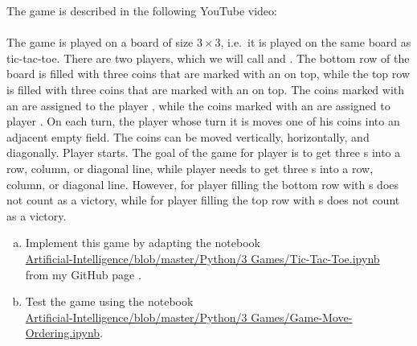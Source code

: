\exercise
The game  is described in the following YouTube video:
\\[0.2cm]
\hspace*{1.3cm}
\href{https://www.youtube.com/watch?v=R-aSW1MQwEo}{}
\\[0.2cm]
The game is played on a board of size $3 \times 3$, i.e.~it is played on the same board as tic-tac-toe.
There are two players, which we will call  and .  The bottom row of the board is filled
with three coins that are marked with an  on top, while the top row is filled with three coins that
are marked with an  on top.  The coins marked with an  are assigned to the player ,
while the coins marked with an  are assigned to player .
On each turn, the player whose turn it is moves one of his coins into an adjacent empty field.  The coins can be
moved vertically, horizontally, and diagonally. 
Player  starts.  The goal of the game for player  is to get three s into a row, column, or
diagonal line, while player  needs to get three s into a row, column, or diagonal line.  However, for
player  filling the bottom row with s does not count as a victory, while for player
  filling the top row with s does not count as a victory.
\begin{enumerate}[(a)]
\item Implement this game by adapting the notebook
      \\[0.2cm]
      \hspace*{1.3cm}
      \href{https://github.com/karlstroetmann/Artificial-Intelligence/blob/master/Python/3 Games/Tic-Tac-Toe.ipynb}{
            Artificial-Intelligence/blob/master/Python/3 Games/Tic-Tac-Toe.ipynb}
      \\[0.2cm]
      from my GitHub page .
\item Test the game using the notebook
      \\[0.2cm]
      \hspace*{1.3cm}
      \href{https://github.com/karlstroetmann/Artificial-Intelligence/blob/master/Python/3 Games/Game-Move-Ordering.ipynb}{
           Artificial-Intelligence/blob/master/Python/3 Games/Game-Move-Ordering.ipynb}.
      \eox
\end{enumerate}
\pagebreak

